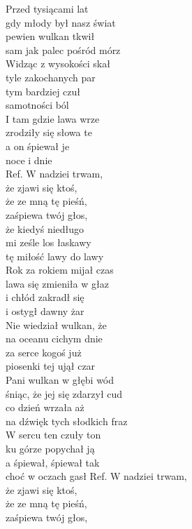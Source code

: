 
Przed tysiącami lat\\
gdy młody był nasz świat\\
pewien wulkan tkwił\\
sam jak palec pośród mórz\\
Widząc z wysokości skał\\
tyle zakochanych par\\
tym bardziej czuł \\ 
samotności ból\\
I tam gdzie lawa wrze\\
zrodziły się słowa te\\
a on śpiewał je \\
noce i dnie\\
\hop
Ref. W nadziei trwam,\\
 że zjawi się ktoś,\\
 że ze mną tę pieśń,\\
 zaśpiewa twój głos,\\
 że kiedyś niedługo\\
 mi ześle los łaskawy\\
 tę miłość lawy do lawy\\
\hop
Rok za rokiem mijał czas\\
lawa się zmieniła w głaz\\
i chłód zakradł się \\
i ostygł dawny żar\\
Nie wiedział wulkan, że \\
na oceanu cichym dnie\\
za serce kogoś już \\
piosenki tej ujął czar\\
Pani wulkan w głębi wód\\
śniąc, że jej się zdarzył cud\\
co dzień wrzała aż\\
na dźwięk tych słodkich fraz\\
W sercu ten czuły ton\\
ku górze popychał ją\\
a śpiewał, śpiewał tak\\
choć w oczach gasł
\hop
Ref. W nadziei trwam,\\
 że zjawi się ktoś,\\
 że ze mną tę pieśń,\\
 zaśpiewa twój głos,\\
